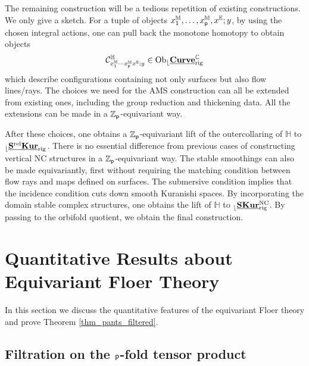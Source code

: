 \documentclass[reqno, 10pt]{amsart}
\numberwithin{equation}{section}
\numberwithin{equation}{section}
\theoremstyle{definition}
\theoremstyle{remark}
\newcommand{\beqn}{\begin{equation*}}
\newcommand{\eeqn}{\end{equation*}}
\newcommand{\mb}{\mathbb}
\newcommand{\mc}{\mathcal}
\newcommand{\p}{{\sf p}}
\newcommand{\zp}{{{\mb Z}_{\sf p}}}
\newcommand{\ep}{{{\mathbb E}}}
\renewcommand{\outer}{{}_{\lfloor}}
\newcommand{\uds}[1]{\underline{\smash{#1}}}
\begin{document}
The remaining construction will be a tedious repetition of existing constructions. We only give a sketch. For a tuple of objects $x_1^{\mb M}, \ldots, x_\p^{\mb M}, x^{\mb E}; y$, by using the chosen integral actions, one can pull back the monotone homotopy to obtain objects
\beqn
{\mc C}_{x_1^{\mb{M}} \cdots x_\p^{\mb M} x^\ep; y}^{\mb H}\in {\rm Ob}\outer \uds{\bf Curve}_{\rm rig}^{\mb C}
\eeqn
which describe configurations containing not only surfaces but also flow lines/rays. The choices we need for the AMS construction can all be extended from existing ones, including the group reduction and thickening data. All the extensions can be made in a $\zp$-equivariant way. 

After these choices, one obtains a $\zp$-equivariant lift of the outercollaring of ${\mb H}$ to $\outer \uds{\bf S^{\rm rel} Kur}_{\rm rig}$. There is no essential difference from previous cases of constructing vertical NC structures in a $\zp$-equivariant way. The stable smoothings can also be made equivariantly, first without requiring the matching condition between flow rays and maps defined on surfaces. The submersive condition implies that the incidence condition cuts down smooth Kuranishi spaces. By incorporating the domain stable complex structures, one obtains the lift of ${\mb H}$ to $\outer \uds{\bf SKur}_{\rm rig}^{\rm NC}$. By passing to the orbifold quotient, we obtain the final construction.
















\section{Quantitative Results about Equivariant Floer Theory}\label{section_equivariant_quantitative}

In this section we discuss the quantitative features of the equivariant Floer theory and prove Theorem \ref{thm_pants_filtered}. 

\subsection{Filtration on the $\p$-fold tensor product}
\end{document}
